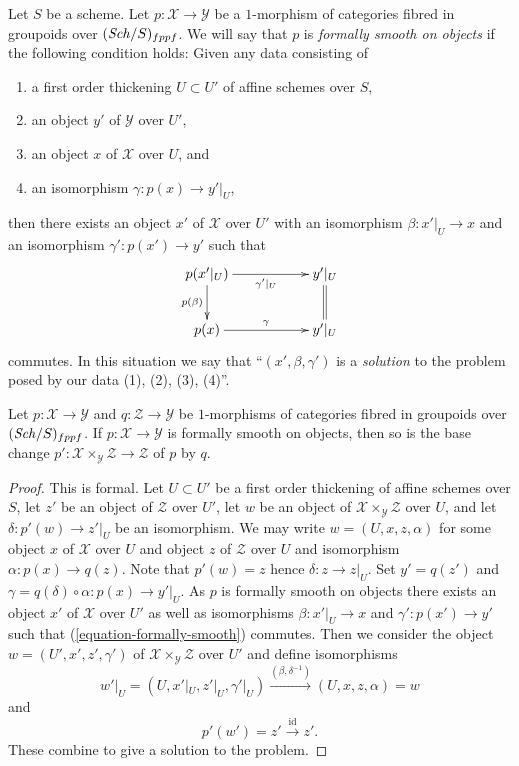 \noindent
Let $S$ be a scheme. Let $p : \mathcal{X} \to \mathcal{Y}$ be a $1$-morphism
of categories fibred in groupoids over $(\mathit{Sch}/S)_{fppf}$. We will say that
$p$ is {\it formally smooth on objects} if the following condition holds:
Given any data consisting of
\begin{enumerate}
\item a first order thickening $U \subset U'$ of affine schemes over $S$,
\item an object $y'$ of $\mathcal{Y}$ over $U'$,
\item an object $x$ of $\mathcal{X}$ over $U$, and
\item an isomorphism $\gamma : p(x) \to y'|_U$,
\end{enumerate}
then there exists an object $x'$ of
$\mathcal{X}$ over $U'$ with an isomorphism
$\beta : x'|_U \to x$ and an isomorphism $\gamma' : p(x') \to y'$
such that
\begin{equation}
\label{equation-formally-smooth}
\vcenter{
\xymatrix{
p(x'|_U) \ar[d]_{p(\beta)} \ar[rr]_{\gamma'|_U} & &
y'|_U \ar@{=}[d] \\
p(x) \ar[rr]^\gamma & & y'|_U
}
}
\end{equation}
commutes.  In this situation we say that ``$(x', \beta, \gamma')$
is a {\it solution} to the problem posed by our data (1), (2), (3), (4)''.

\begin{lemma}
\label{lemma-base-change-formally-smooth}
Let $p : \mathcal{X} \to \mathcal{Y}$ and $q : \mathcal{Z} \to \mathcal{Y}$
be $1$-morphisms of categories fibred in groupoids over $(\mathit{Sch}/S)_{fppf}$.
If $p : \mathcal{X} \to \mathcal{Y}$ is formally smooth on objects, then so
is the base change
$p' : \mathcal{X} \times_\mathcal{Y} \mathcal{Z} \to \mathcal{Z}$
of $p$ by $q$.
\end{lemma}

\begin{proof}
This is formal. Let $U \subset U'$ be a first order thickening
of affine schemes over $S$, let $z'$ be an object of $\mathcal{Z}$
over $U'$, let $w$ be an object of
$\mathcal{X} \times_\mathcal{Y} \mathcal{Z}$ over $U$, and let
$\delta : p'(w) \to z'|_U$ be an isomorphism.
We may write
$w = (U, x, z, \alpha)$ for some object $x$ of $\mathcal{X}$ over $U$
and object $z$ of $\mathcal{Z}$ over $U$ and isomorphism
$\alpha : p(x) \to q(z)$. Note that $p'(w) = z$ hence
$\delta : z \to z|_U$. Set $y' = q(z')$ and
$\gamma = q(\delta) \circ \alpha : p(x) \to y'|_U$.
As $p$ is formally smooth on objects there exists an
object $x'$ of $\mathcal{X}$ over $U'$ as well as
isomorphisms $\beta : x'|_U \to x$ and $\gamma' : p(x') \to y'$ such that
(\ref{equation-formally-smooth}) commutes. Then we consider the object
$w = (U', x', z', \gamma')$ of $\mathcal{X} \times_\mathcal{Y} \mathcal{Z}$
over $U'$ and define isomorphisms
$$
w'|_U = (U, x'|_U, z'|_U, \gamma'|_U)
\xrightarrow{(\beta, \delta^{-1})}
(U, x, z, \alpha) = w
$$
and
$$
p'(w') = z' \xrightarrow{\text{id}} z'.
$$
These combine to give a solution to the problem.
\end{proof}

